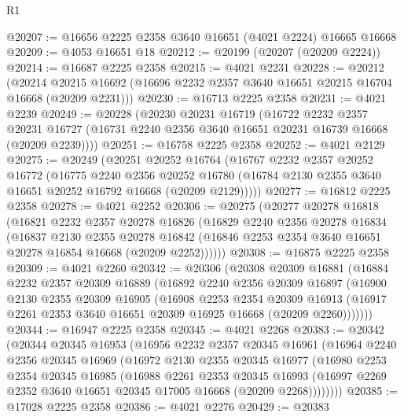 \begin{lexlean}{R1}
\begin{coremodule}
@20207 := @16656 @2225 @2358 @3640 @16651 (@4021 @2224) @16665 @16668
@20209 := @4053 @16651 @18
@20212 := @20199 (@20207 (@20209 @2224))
@20214 := @16687 @2225 @2358
@20215 := @4021 @2231
@20228 := @20212
    (@20214 @20215 @16692 (@16696 @2232 @2357 @3640 @16651 @20215 @16704 @16668 (@20209 @2231)))
@20230 := @16713 @2225 @2358
@20231 := @4021 @2239
@20249 := @20228
    (@20230
      @20231
      @16719
      (@16722
        @2232
        @2357
        @20231
        @16727
        (@16731 @2240 @2356 @3640 @16651 @20231 @16739 @16668 (@20209 @2239))))
@20251 := @16758 @2225 @2358
@20252 := @4021 @2129
@20275 := @20249
    (@20251
      @20252
      @16764
      (@16767
        @2232
        @2357
        @20252
        @16772
        (@16775
          @2240
          @2356
          @20252
          @16780
          (@16784 @2130 @2355 @3640 @16651 @20252 @16792 @16668 (@20209 @2129)))))
@20277 := @16812 @2225 @2358
@20278 := @4021 @2252
@20306 := @20275
    (@20277
      @20278
      @16818
      (@16821
        @2232
        @2357
        @20278
        @16826
        (@16829
          @2240
          @2356
          @20278
          @16834
          (@16837
            @2130
            @2355
            @20278
            @16842
            (@16846 @2253 @2354 @3640 @16651 @20278 @16854 @16668 (@20209 @2252))))))
@20308 := @16875 @2225 @2358
@20309 := @4021 @2260
@20342 := @20306
    (@20308
      @20309
      @16881
      (@16884
        @2232
        @2357
        @20309
        @16889
        (@16892
          @2240
          @2356
          @20309
          @16897
          (@16900
            @2130
            @2355
            @20309
            @16905
            (@16908
              @2253
              @2354
              @20309
              @16913
              (@16917 @2261 @2353 @3640 @16651 @20309 @16925 @16668 (@20209 @2260)))))))
@20344 := @16947 @2225 @2358
@20345 := @4021 @2268
@20383 := @20342
    (@20344
      @20345
      @16953
      (@16956
        @2232
        @2357
        @20345
        @16961
        (@16964
          @2240
          @2356
          @20345
          @16969
          (@16972
            @2130
            @2355
            @20345
            @16977
            (@16980
              @2253
              @2354
              @20345
              @16985
              (@16988
                @2261
                @2353
                @20345
                @16993
                (@16997 @2269 @2352 @3640 @16651 @20345 @17005 @16668 (@20209 @2268))))))))
@20385 := @17028 @2225 @2358
@20386 := @4021 @2276
@20429 := @20383

\end{coremodule}
\end{lexlean}
